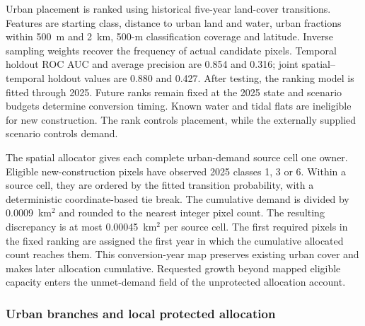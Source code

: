 Urban placement is ranked using historical five-year land-cover transitions. Features are starting class, distance to urban land and water, urban fractions within 500~m and 2~km, 500-m classification coverage and latitude. Inverse sampling weights recover the frequency of actual candidate pixels. Temporal holdout ROC AUC and average precision are 0.854 and 0.316; joint spatial--temporal holdout values are 0.880 and 0.427. After testing, the ranking model is fitted through 2025. Future ranks remain fixed at the 2025 state and scenario budgets determine conversion timing. Known water and tidal flats are ineligible for new construction. The rank controls placement, while the externally supplied scenario controls demand.

The spatial allocator gives each complete urban-demand source cell one owner. Eligible new-construction pixels have observed 2025 classes 1, 3 or 6. Within a source cell, they are ordered by the fitted transition probability, with a deterministic coordinate-based tie break. The cumulative demand is divided by 0.0009~km$^2$ and rounded to the nearest integer pixel count. The resulting discrepancy is at most 0.00045~km$^2$ per source cell. The first required pixels in the fixed ranking are assigned the first year in which the cumulative allocated count reaches them. This conversion-year map preserves existing urban cover and makes later allocation cumulative. Requested growth beyond mapped eligible capacity enters the unmet-demand field of the unprotected allocation account.

\subsubsection{Urban branches and local protected allocation}

